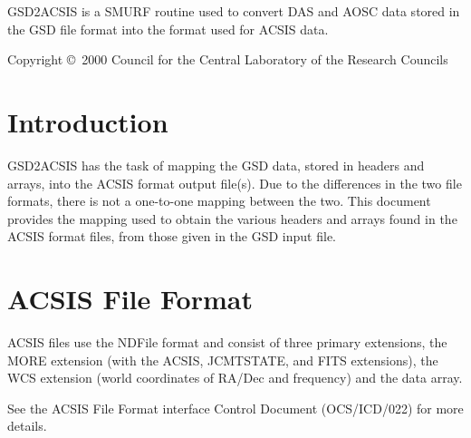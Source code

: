 \documentclass[twoside,11pt]{article}
\newcommand{\stardocinitials}  {SUN}
\newcommand{\stardoccopyright}
{Copyright \copyright\ 2000 Council for the Central Laboratory of the Research Councils}
\newcommand{\stardocnumber}    {259.1}
\newcommand{\stardocabstract}  {
GSD2ACSIS is a SMURF routine used to convert DAS and AOSC data stored in the GSD file format into the format used for ACSIS data.
}
\newcommand{\stardocname}{\stardocinitials /\stardocnumber}
\newcommand{\htmladdnormallink}[2]{#1}
\newenvironment{latexonly}{}{}
\newcommand{\xref}[3]{#1}
\newcommand{\xlabel}[1]{}
\renewcommand{\_}{\texttt{\symbol{95}}}
\renewcommand{\thepage}{\roman{page}}
\begin{document}
\stardocabstract

\begin{latexonly}
\newpage
\vspace*{\fill}
\stardoccopyright
\end{latexonly}

  \newpage
  \begin{latexonly}
    \setlength{\parskip}{0mm}
    \tableofcontents
    \setlength{\parskip}{\medskipamount}
    \markboth{\stardocname}{\stardocname}
  \end{latexonly}

\cleardoublepage
\renewcommand{\thepage}{\arabic{page}}
\setcounter{page}{1}


\section{\xlabel{introduction}Introduction}
GSD2ACSIS has the task of mapping the GSD data, stored in headers and arrays, into the ACSIS format output file(s).  Due to the differences in the two file formats, there is not a one-to-one mapping between the two.  This document provides the mapping used to obtain the various headers and arrays found in the ACSIS format files, from those given in the GSD input file.

\section{\xlabel{ACSIS_file_format}ACSIS File Format}
ACSIS files use the \xref{NDF}{sun33} file format and consist of three primary extensions, the MORE extension (with the ACSIS, JCMTSTATE, and FITS extensions), the WCS extension (world coordinates of RA/Dec and frequency) and the data array.

See the ACSIS File Format interface Control Document (\htmladdnormallink{OCS/ICD/022}{http://docs.jach.hawaii.edu/JCMT/OCS/ICD/022/ocs_icd_022.pdf}) for more details.
\end{document}
